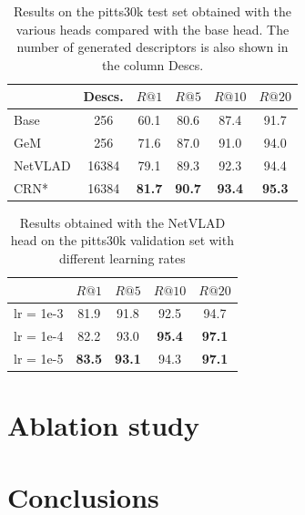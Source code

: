 \documentclass[10pt,twocolumn,letterpaper]{article}
\begin{document}
\begin{table}
   \centering
\begin{tabular}{|l|c|c|c|c|c|}
\hline
         & Descs.&        $R@1$   &        $R@5$   &        $R@10$  &        $R@20$   \\ \hline
Base     & 256   &         60.1   &         80.6   &          87.4   &          91.7   \\
GeM      & 256   &         71.6   &         87.0   &          91.0   &          94.0   \\
NetVLAD  & 16384 &         79.1   &         89.3   &          92.3   &          94.4   \\ \hline
CRN*     & 16384 &\textbf{81.7}  & \textbf{90.7}  &  \textbf{93.4}  &  \textbf{95.3}  \\\hline
\end{tabular}
\caption{Results on the pitts30k test set obtained with the various heads compared with the base head. The number of generated descriptors 
is also shown in the column Descs.}
\label{tab:base_results}
\end{table}

\begin{table}
   \centering
 \begin{tabular}{|l|c|c|c|c|}
\hline
          &          $R@1$  &        $R@5$  &        $R@10$ &        $R@20$   \\ \hline     
lr = 1e-3 &         81.9    &         91.8  &         92.5  &         94.7       \\
lr = 1e-4 &         82.2    &         93.0  & \textbf{95.4} & \textbf{97.1}  \\    
lr = 1e-5 & \textbf{83.5}   & \textbf{93.1} &         94.3  & \textbf{97.1}          \\
\hline
\end{tabular}
\caption{Results obtained with the NetVLAD head on the pitts30k validation set with different learning rates}
\label{tab:NETVLAD:lr}
\end{table}

\section{Ablation study}

\section{Conclusions}

{\small


}
\end{document}

